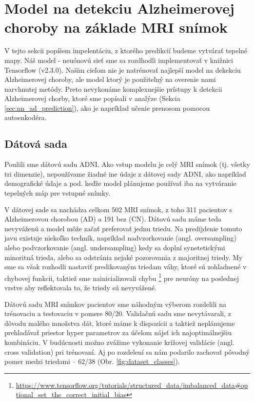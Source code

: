 \section{Model na detekciu Alzheimerovej choroby na základe MRI snímok}

V tejto sekcii popíšem impelentáciu, z ktorého predikcií budeme vytvárať tepelné mapy. Náš model - neuónovú sieť sme sa rozdhodli implementovať v knižnici Tensorflow (v2.3.0). Naším cieľom nie je natrénovať najlepší model na dekekciu Alzheimerovej choroby, ale model ktorý je použiteľný na overenie nami narvhnutej metódy. Preto nevykonáme komplexnejšie prístupy k detekcii Alzheimerovej chorby, ktoré sme popísali v analýze (Sekcia \ref{sec:nn_ad_prediction}), ako je napríklad učenie prenosom pomocou autoenkodéra.

\subsection{Dátová sada}

Použili sme dátovú sadu ADNI. Ako vstup modelu je celý MRI snímok (tj. všetky tri dimenzie), nepoužívame žiadné ine údaje z dátovej sady ADNI, ako napríklad demografické údaje a pod. keďže model plánujeme používať iba na vytváranie tepelných máp pre vstupné snímky. 

V dátovej sade sa nachádza celkom 502 MRI snímok, z toho 311 pacientov s Alzheimerovou chorobou (AD) a 191 bez (CN). Dátovú sadu máme teda nevyváženú a model môže začať preferovať jednu triedu. Na predíjdenie tomuto javu existuje niekoľko techník, napríklad nadvzorkovanie (angl. oversampling) alebo podvzorkovanie (angl. undersampling) kedy sa doplní synetetickými minoritná trieda, alebo sa odstránia nejaké pozorovania z majoritnej triedy. My sme sa však rozhodli nastaviť predikovaným triedam váhy, ktoré sú zohladnené v chybovej funkcii, taktiež sme nainicializovali chybu \footnote{\url{https://www.tensorflow.org/tutorials/structured\_data/imbalanced\_data\#optional\_set\_the\_correct\_initial\_bias}} pre neuróny na poslednej vrstve aby reflektovala to, že triedy sú nevyvážené.

Dátovú sadu MRI snímkov pacientov sme náhodným výberom rozdelili na trénovaciu a testovaciu v pomere 80/20. Validačnú sadu sme nevytávarali, z dôvodu malého množstva dát, ktoré máme k dispozícii a taktiež neplánujeme prehladávať priestor hyper parametrov za účelom nájsť ich najoptimálnejšiu kombináciu. V budúcnosti možno zvážime vykonanie krížovej validácie (angl. cross validation) pri trénovaní. Aj po rozdelení sa nám podarilo zachovať pôvodný pomer medzi triedami -- 62/38 (Obr. \ref{fig:dataset_classes}).

